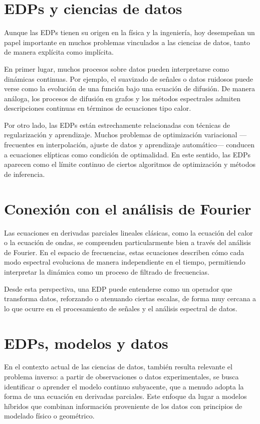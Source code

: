 \documentclass[12pt, a4paper]{amsbook}
\theoremstyle{remark}
\theoremstyle{definition}
\numberwithin{section}{chapter}
\numberwithin{subsection}{section}
\numberwithin{equation}{section}
\numberwithin{figure}{chapter}
\begin{document}
\section{EDPs y ciencias de datos}

Aunque las EDPs tienen su origen en la física y la ingeniería, hoy desempeñan un papel importante en muchos problemas vinculados a las ciencias de datos, tanto de manera explícita como implícita.

En primer lugar, muchos procesos sobre datos pueden interpretarse como dinámicas continuas. Por ejemplo, el suavizado de señales o datos ruidosos puede verse como la evolución de una función bajo una ecuación de difusión. De manera análoga, los procesos de difusión en grafos y los métodos espectrales admiten descripciones continuas en términos de ecuaciones tipo calor.

Por otro lado, las EDPs están estrechamente relacionadas con técnicas de regularización y aprendizaje. Muchos problemas de optimización variacional —frecuentes en interpolación, ajuste de datos y aprendizaje automático— conducen a ecuaciones elípticas como condición de optimalidad. En este sentido, las EDPs aparecen como el límite continuo de ciertos algoritmos de optimización y métodos de inferencia.

\section{Conexión con el análisis de Fourier}

Las ecuaciones en derivadas parciales lineales clásicas, como la ecuación del calor o la ecuación de ondas, se comprenden particularmente bien a través del análisis de Fourier. En el espacio de frecuencias, estas ecuaciones describen cómo cada modo espectral evoluciona de manera independiente en el tiempo, permitiendo interpretar la dinámica como un proceso de filtrado de frecuencias.

Desde esta perspectiva, una EDP puede entenderse como un operador que transforma datos, reforzando o atenuando ciertas escalas, de forma muy cercana a lo que ocurre en el procesamiento de señales y el análisis espectral de datos.

\section{EDPs, modelos y datos}

En el contexto actual de las ciencias de datos, también resulta relevante el problema inverso: a partir de observaciones o datos experimentales, se busca identificar o aprender el modelo continuo subyacente, que a menudo adopta la forma de una ecuación en derivadas parciales. Este enfoque da lugar a modelos híbridos que combinan información proveniente de los datos con principios de modelado físico o geométrico.
\end{document}

